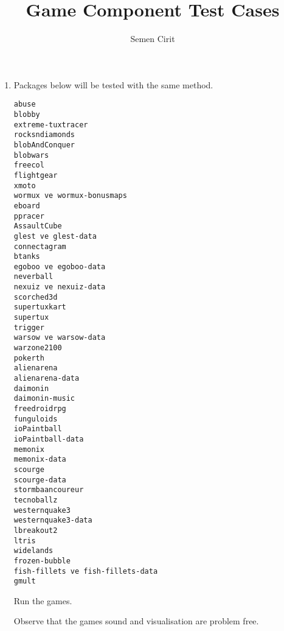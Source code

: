 \documentclass[a4paper,10pt]{article}
\title{Game Component Test Cases }
\author{Semen Cirit}
\begin{document}
\maketitle

\begin{enumerate}
\item Packages below will be tested with the same method.
\begin{verbatim}
abuse
blobby
extreme-tuxtracer
rocksndiamonds 
blobAndConquer
blobwars
freecol
flightgear
xmoto
wormux ve wormux-bonusmaps
eboard
ppracer
AssaultCube
glest ve glest-data
connectagram
btanks
egoboo ve egoboo-data
neverball
nexuiz ve nexuiz-data
scorched3d
supertuxkart
supertux
trigger
warsow ve warsow-data
warzone2100
pokerth
alienarena
alienarena-data
daimonin
daimonin-music
freedroidrpg
funguloids
ioPaintball
ioPaintball-data
memonix
memonix-data
scourge
scourge-data
stormbaancoureur
tecnoballz
westernquake3
westernquake3-data
lbreakout2
ltris
widelands
frozen-bubble
fish-fillets ve fish-fillets-data
gmult

\end{verbatim}

Run the games.

Observe that the games sound and visualisation are problem free.
\end{enumerate}
\end{document}
